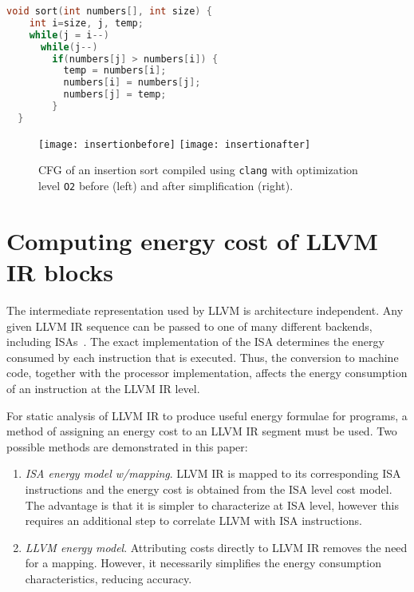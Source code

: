 \documentclass[9pt,preprint]{sigplanconf}
\newcommand{\figlabel}[1]{\label{fig:#1}}
\begin{document}
\begin{lstlisting}[language=C,float,caption={This insertion sort demonstrates that certain classes of programs require further analysis or transformation.},label=fig:insertion]
  void sort(int numbers[], int size) {
    int i=size, j, temp;
    while(j = i--)
      while(j--)
        if(numbers[j] > numbers[i]) {
          temp = numbers[i];
          numbers[i] = numbers[j];
          numbers[j] = temp;
        }
  }
\end{lstlisting}

\begin{figure}
\begin{center}
\texttt{[image: insertionbefore]}
\texttt{[image: insertionafter]}
\end{center}
\caption{\figlabel{insertioncfgbefore}\figlabel{insertioncfgafter}
CFG of an insertion sort compiled using \texttt{clang} with optimization
  level \texttt{O2} before (left) and after simplification (right).}
\end{figure}


\section{Computing energy cost of LLVM IR blocks}

The intermediate representation used by LLVM is architecture independent. Any
given LLVM IR sequence can be passed to one of many different backends,
including ISAs~\cite{LLVM-backend}.  The exact implementation of the ISA
determines the energy consumed by each instruction that is executed.  Thus, the
conversion to machine code, together with the processor implementation, affects
the energy consumption of an instruction at the LLVM IR level.

For static analysis of LLVM IR to produce useful energy formulae for programs, a
method of assigning an energy cost to an LLVM IR segment must be used. Two
possible methods are demonstrated in this paper:
\begin{enumerate}
  \item \emph{ISA energy model w/mapping}. LLVM IR is mapped to its corresponding
    ISA instructions and the energy cost is obtained from the ISA level cost
    model. The advantage is that it is simpler to characterize at ISA level, however this requires an additional step to correlate
    LLVM with ISA instructions.
  \item \emph{LLVM energy model}. Attributing costs directly to LLVM IR removes
    the need for a mapping. However, it necessarily simplifies the energy
    consumption characteristics, reducing accuracy.
\end{enumerate}
\end{document}

